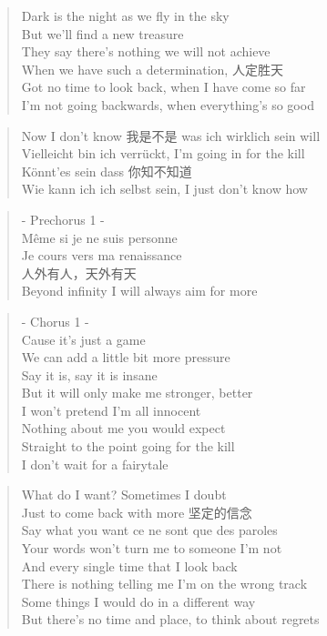 \bckg

\begin{verse}
Dark is the night as we fly in the sky\\
But we'll find a new treasure\\
They say there's nothing we will not achieve\\
When we have such a determination, 人定胜天\\
Got no time to look back, when I have come so far\\
I'm not going backwards, when everything's so good
\end{verse}

\begin{verse}
Now I don't know 我是不是 was ich wirklich sein will\\
Vielleicht bin ich verrückt, I'm going in for the kill\\
Könnt'es sein dass 你知不知道\\
Wie kann ich ich selbst sein, I just don't know how
\end{verse}

\begin{verse}
- Prechorus 1 -\\
Même si je ne suis personne\\
Je cours vers ma renaissance\\
人外有人，天外有天\\
Beyond infinity I will always aim for more
\end{verse}

\clearpage
\bckg

\begin{verse}
- Chorus 1 -\\
Cause it's just a game\\
We can add a little bit more pressure\\
Say it is, say it is insane\\
But it will only make me stronger, better\\
I won't pretend I'm all innocent\\
Nothing about me you would expect\\
Straight to the point going for the kill\\
I don't wait for a fairytale
\end{verse}

\begin{verse}
What do I want? Sometimes I doubt\\
Just to come back with more 坚定的信念\\
Say what you want ce ne sont que des paroles\\
Your words won't turn me to someone I'm not\\
And every single time that I look back\\
There is nothing telling me I'm on the wrong track\\
Some things I would do in a different way\\
But there's no time and place, to think about regrets
\end{verse}

